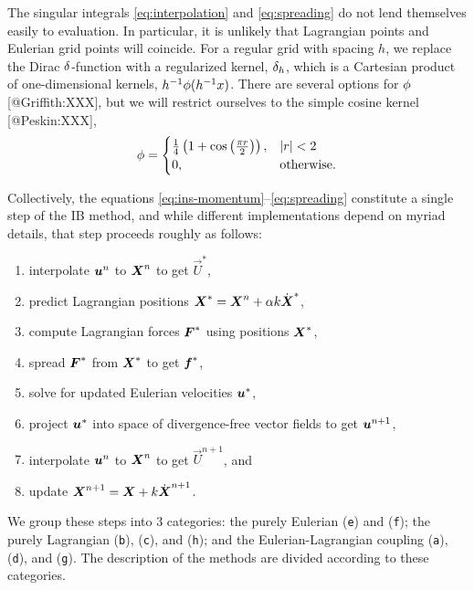 The singular integrals \eqref{eq:interpolation} and \eqref{eq:spreading} do not
lend themselves easily to evaluation. In particular, it is unlikely that
Lagrangian points and Eulerian grid points will coincide. For a regular grid
with spacing $h$, we replace the Dirac $\delta$-function with a regularized
kernel, $\delta_h$, which is a Cartesian product of one-dimensional kernels,
$h^{-1}\phi(h^{-1}x)$. There are several options for $\phi$ [@Griffith:XXX],
but we will restrict ourselves to the simple cosine kernel [@Peskin:XXX],
\begin{equation}
    \phi = \begin{cases}
        \frac14\left(1+\cos\left(\frac{\pi r}{2}\right)\right), & |r| < 2 \\
        0, & \text{otherwise.}
    \end{cases}
    \label{eq:kernel}
\end{equation}

Collectively, the equations \eqref{eq:ins-momentum}--\eqref{eq:spreading}
constitute a single step of the IB method, and while different implementations
depend on myriad details, that step proceeds roughly as follows:
\begin{enumerate}[label=(\texttt{\alph*})]
    \item interpolate $\boldsymbol{u}^n$ to $\boldsymbol{X}^n$ to get $\vec{U}^\ast$,
    \item predict Lagrangian positions $\boldsymbol{X}^\ast = \boldsymbol{X}^n + \alpha k\dot{\boldsymbol{X}}^\ast$,
    \item compute Lagrangian forces $\boldsymbol{F}^\ast$ using positions $\boldsymbol{X}^\ast$,
    \item spread $\boldsymbol{F}^\ast$ from $\boldsymbol{X}^\ast$ to get $\boldsymbol{f}^\ast$,
    \item solve for updated Eulerian velocities $\boldsymbol{u}^\ast$,
    \item project $\boldsymbol{u}^\ast$ into space of divergence-free vector fields to
        get $\boldsymbol{u}^{n+1}$,
    \item interpolate $\boldsymbol{u}^{n}$ to $\boldsymbol{X}^n$ to get $\vec{U}^{n+1}$, and
    \item update $\boldsymbol{X}^{n+1} = \boldsymbol{X} + k \dot{\boldsymbol{X}}^{n+1}$.
\end{enumerate}
We group these steps into 3 categories: the purely Eulerian
(\texttt{e}) and (\texttt{f}); the purely Lagrangian (\texttt{b}), (\texttt{c}),
and (\texttt{h}); and the Eulerian-Lagrangian coupling (\texttt{a}),
(\texttt{d}), and (\texttt{g}). The description of the methods are divided
according to these categories.

